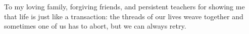 To my loving family, forgiving friends, and persistent teachers for showing me that life is just like a transaction: the threads of our lives weave together and sometimes one of us has to abort, but we can always retry.
